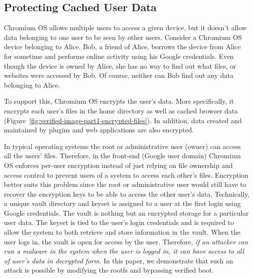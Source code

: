 \documentclass[11pt]{article}
\begin{document}
\subsection{Protecting Cached User Data}
\label{pcud}
Chromium OS allows multiple users to access a given device, but it doesn't allow data belonging to one user to be seen by other
users. Consider a Chromium OS device belonging to Alice. Bob, a friend of Alice, borrows the device from Alice for sometime and performs online activity using his Google credentials. Even though the device is owned by Alice, she has no way to find out what files, or websites were accessed by Bob. Of course, neither can Bob find out any data belonging to Alice.

To support this, Chromium OS encrypts the user's data. More specifically, it encrypts each user's files in the home directory as well as cached browser data (Figure~\ref{fig:verified-image-part1-encrypted-files}). In addition, data created and maintained by plugins and web applications are also encrypted.

In typical operating systems the root or administrative user (owner) can access all the users' files. Therefore, in the front-end (Google user domain) Chromium OS enforces per-user encryption instead of just relying on file ownership and access control to prevent users of a system to access each other's files. Encryption better suits this problem since the root or administrative user would still have to recover the encryption keys to be able to access the other user's data. Technically, a unique vault directory and keyset is assigned to a user at the first login using Google credentials.  The vault is nothing but an encrypted storage for a particular user data.  The keyset is tied to the user's login credentials and is required to allow the system to both retrieve and store information in the vault.  When the user logs in, the vault is open for access by the user. Therefore, \emph{if an attacker can run a malware in the system when the user is logged in, it can have access to all of user's data in decrypted form}. In this paper, we demonstrate that such an attack is possible by modifying the rootfs and bypassing verified boot.
\end{document}
